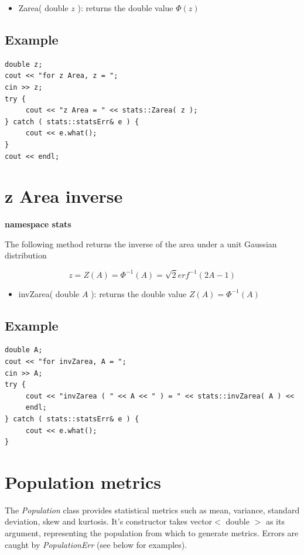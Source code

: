 \documentclass{report}
\begin{document}
\begin{itemize}
\item Zarea( double $z$ ): returns the double value $\Phi(z)$
\end{itemize}

\subsection{Example}
\begin{verbatim}
double z;
cout << "for z Area, z = ";
cin >> z;
try {
     cout << "z Area = " << stats::Zarea( z );
} catch ( stats::statsErr& e ) {
     cout << e.what();
}
cout << endl;
\end{verbatim}

\section{z Area inverse}\label{invZarea}

{\bf namespace stats}

The following method returns the inverse of the area under a unit
Gaussian distribution

\begin{equation}
z = Z(A) = \Phi^{-1}(A) = \sqrt{2}erf^{-1}(2A - 1)
\end{equation}

\begin{itemize}
\item invZarea( double $A$ ): returns the double value
$Z(A) = \Phi^{-1}(A)$
\end{itemize}

\subsection{Example}
\begin{verbatim}
double A;
cout << "for invZarea, A = ";
cin >> A;
try {
     cout << "invZarea ( " << A << " ) = " << stats::invZarea( A ) <<
     endl;
} catch ( stats::statsErr& e ) {
     cout << e.what();
}
\end{verbatim}

\section{Population metrics}

The {\em Population} class provides statistical metrics such as mean,
variance, standard deviation, skew and kurtosis.  It's constructor
takes vector$<$ double $>$ as its argument, representing the
population from which to generate metrics.  Errors are caught by {\em
PopulationErr} (see below for examples).
\end{document}
